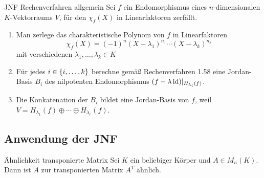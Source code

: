 \documentclass[main.tex]{subfiles}
\begin{document}
\begin{karte}{JNF Rechenverfahren allgemein}
    Sei \(f\) ein Endomorphismus eines \(n\)-dimensionalen \(K\)-Vektorraums \(V\),
    für den \(\chi_f(X)\) in Linearfaktoren zerfällt.
    \begin{enumerate}
        \item Man zerlege das charakteristische Polynom von \(f\) in
        Linearfaktoren
        \[ \chi_f(X) = (-1)^n (X-\lambda_1)^{n_1}\cdots (X-\lambda_k)^{n_k} \]
        mit verschiedenen \(\lambda_1, \ldots, \lambda_k \in K\)
        \item Für jedes \(i \in \{i,\ldots,k\}\) berechne gemäß Rechenverfahren
        1.58 eine Jordan-Basis \(B_i\) des nilpotenten Endomorphismus
        \( (f-\lambda \operatorname{id})\vert_{H_{\lambda_i}(f)} \).
        \item Die Konkatenation der \(B_i\) bildet eine Jordan-Basis von \(f\),
        weil \(V = H_{\lambda_1}(f) \oplus \cdots \oplus H_{\lambda_r}(f)\).
    \end{enumerate}
\end{karte}

\subsection*{Anwendung der JNF}

\begin{karte}{Ähnlichkeit transponierte Matrix}
    Sei \(K\) ein beliebiger Körper und \(A \in M_n(K)\). Dann ist 
    \(A\) zur transponierten Matrix \(A^T\) ähnlich.
\end{karte}
\end{document}

